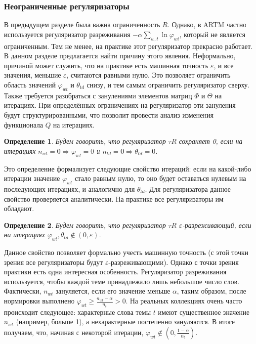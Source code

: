 \documentclass[12pt]{article}
\newtheorem{definition}{Определение}[section]
\renewcommand{\geq}{\geqslant}
\renewcommand{\phi}{\varphi}
\begin{document}
\subsubsection{Неограниченные регуляризаторы}
\label{subsec:unboundreg}
В предыдущем разделе была важна ограниченность $R$. Однако, в ARTM частно используется регуляризатор разреживания $- \alpha \sum_{w,t}\ln \phi_{wt}$, который не является ограниченным. Тем не менее,  на практике этот регуляризатор прекрасно работает. В данном разделе предлагается найти причину этого явления. Неформально, причиной может служить, что на практике есть машинная точность $\varepsilon$, и все значения, меньшие $\varepsilon$, считаются равными нулю. Это позволяет ограничить область значений $\phi_{wt}$ и $\theta_{td}$ снизу, и тем самым ограничить регуляризатор сверху. Также требуется разобраться с занулениями элементов матриц $\Phi$ и $\Theta$ на итерациях. При определённых  ограничениях на регуляризатор эти зануления будут структурированными, что позволит провести анализ изменения функционала $Q$ на итерациях.
\begin{definition}
Будем говорить, что регуляризатор $\tau R$ сохраняет 0, если на итерациях $n_{wt} = 0 \Rightarrow \phi_{wt} = 0$ и $n_{td} = 0 \Rightarrow \theta_{td} = 0$.
\end{definition}

Это определение формализует следующие свойство итераций: если на какой-либо итерации значение $\phi_{wt}$ стало равным нулю, то оно будет оставаться нулевым на последующих итерациях, и аналогично для $\theta_{td}$. Для регуляризатора данное свойство проверяется аналитически. На практике все регуляризаторы им обладают.
\begin{definition}
\label{sparsereg}
Будем говорить, что регуляризатор $\tau R$ $\varepsilon$-разреживающий, если на итерациях $\phi_{wt}, \theta_{td} \notin (0, \varepsilon)$.
\end{definition}

Данное свойство позволяет формально учесть машинную точность (с этой точки зрения все регуляризаторы будут $\varepsilon$-разреживающими). Однако с точки зрения практики есть одна интересная особенность. Регуляризатор разреживания используется, чтобы каждой теме принадлежало лишь небольшое число слов. Фактически,  $n_{wt}$ зануляется, если его значение меньше $\alpha$, таким образом, после нормировки выполнено $\phi_{wt} \geq \frac{n_{wt} - \alpha}{n_t} > 0$.  На реальных коллекциях очень часто происходит следующее: характерные слова темы $t$ имеют существенное значение $n_{wt}$ (например, больше 1), а нехарактерные постепенно зануляются. В итоге получаем, что, начиная с некоторой итерации, $\phi_{wt} \notin (0, \frac{1-\alpha}{n_t})$.
\end{document}
